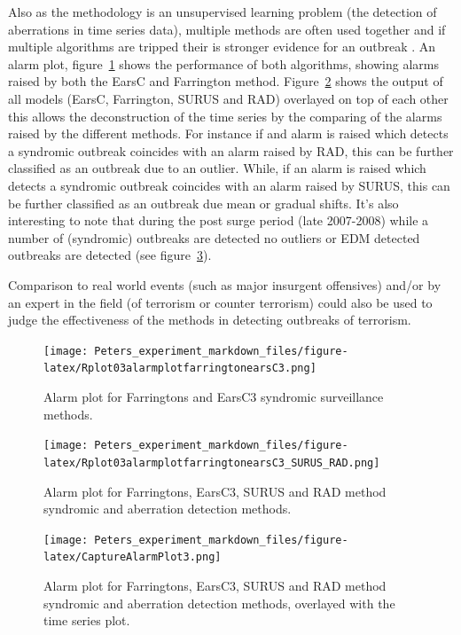 Also as the methodology is an unsupervised learning problem (the detection of aberrations in time series data), multiple methods are often used together and if multiple algorithms are tripped their is stronger evidence for an outbreak \citep{reis2003time}. An alarm plot, figure~\ref{fig:alarmplot1} shows the performance of both algorithms, showing alarms raised by both the EarsC and Farrington method. Figure~\ref{fig:alarmplot2} shows the output of all models (EarsC, Farrington, SURUS and RAD) overlayed on top of each other this allows the deconstruction of the time series by the comparing of the alarms raised by the different methods. For instance if and alarm is raised which detects a syndromic outbreak coincides with an alarm raised by RAD, this can be further classified as an outbreak due to an outlier. While, if an alarm is raised which detects a syndromic outbreak coincides with an alarm raised by SURUS, this can be further classified as an outbreak due mean or gradual shifts. It's also interesting to note that during the post surge period (late 2007-2008) while a number of (syndromic) outbreaks are detected no outliers or EDM detected outbreaks are detected (see figure~\ref{fig:CaptureAlarmPlot3}).

Comparison to real world events (such as major insurgent offensives) and/or by an expert in the field (of terrorism or counter terrorism) could also be used to judge the effectiveness of the methods in detecting outbreaks of terrorism. 


\begin{figure}[t]
\texttt{[image: Peters\_experiment\_markdown\_files/figure-latex/Rplot03alarmplotfarringtonearsC3.png]}
\label{fig:alarmplot1}
\centering
\caption{Alarm plot for Farringtons and EarsC3 syndromic surveillance methods.}
\end{figure}


\begin{figure}[t]
\texttt{[image: Peters\_experiment\_markdown\_files/figure-latex/Rplot03alarmplotfarringtonearsC3\_SURUS\_RAD.png]}
\label{fig:alarmplot2}
\centering
\caption{Alarm plot for Farringtons, EarsC3, SURUS and RAD method syndromic and aberration detection methods.}
\end{figure}


\begin{figure}[t]
\texttt{[image: Peters\_experiment\_markdown\_files/figure-latex/CaptureAlarmPlot3.png]}
\label{fig:CaptureAlarmPlot3}
\centering
\caption{Alarm plot for Farringtons, EarsC3, SURUS and RAD method syndromic and aberration detection methods, overlayed with the time series plot.}
\end{figure}


